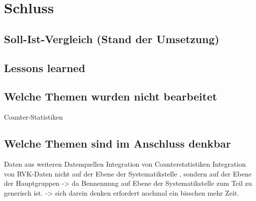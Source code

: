 
\chapter{Schluss}
\label{chap:six}
\section{Soll-Ist-Vergleich (Stand der Umsetzung)}
\section{Lessons learned}
\section{Welche Themen wurden nicht bearbeitet}
Counter-Statistiken

\section{Welche Themen sind im Anschluss denkbar}
Daten aus weiteren Datenquellen
Integration von Counterstatistiken
Integration von RVK-Daten nicht auf der Ebene der Systematikstelle , sondern auf der Ebene
der Hauptgruppen -> da Bennennung auf Ebene der Systematikstelle zum Teil zu generisch ist. 
-> sich darein denken erfordert nochmal ein bisschen mehr Zeit.